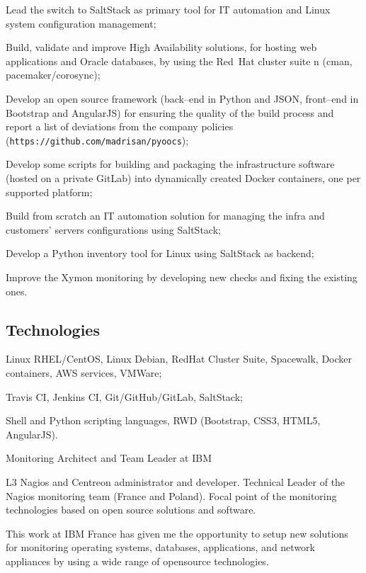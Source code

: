 \item{\bdot} Lead the switch to SaltStack as primary tool for IT automation and Linux
   system configuration management;
\item{\bdot} Build, validate and improve High Availability solutions,
   for hosting web applications and Oracle databases, by using the Red~Hat cluster suite
n   (cman, pacemaker/corosync);
\item{\bdot} Develop an open source framework (back--end in Python and JSON, front--end in
   Bootstrap and AngularJS) for ensuring the quality of the build process and report
   a list of deviations from the company policies
   ({\tt https://github.com/madrisan/pyoocs});
\item{\bdot} Develop some scripts for building and packaging the infrastructure software
   (hosted on a private GitLab) into dynamically created Docker containers,
   one per supported platform;
\item{\bdot} Build from scratch an IT automation solution for managing the infra and
   customers' servers configurations using SaltStack;
\item{\bdot} Develop a Python inventory tool for Linux using SaltStack as backend;
\item{\bdot} Improve the Xymon monitoring by developing new checks and fixing the
   existing ones.

\subsection{Technologies}

\item{\bdot} Linux RHEL/CentOS, Linux Debian, RedHat Cluster Suite, Spacewalk, Docker
   containers, AWS services, VMWare;
\item{\bdot} Travis CI, Jenkins CI, Git/GitHub/GitLab, SaltStack;
\item{\bdot} Shell and Python scripting languages, RWD (Bootstrap, CSS3, HTML5, AngularJS).


   {Monitoring Architect and Team Leader at IBM}

L3 Nagios and Centreon administrator and developer.
Technical Leader of the Nagios monitoring team (France and Poland).
Focal point of the monitoring technologies based on open source solutions and
software.

This work at IBM France has given me the opportunity to setup new solutions 
for monitoring operating systems, databases, applications, and network 
appliances by using a wide range of opensource technologies.

